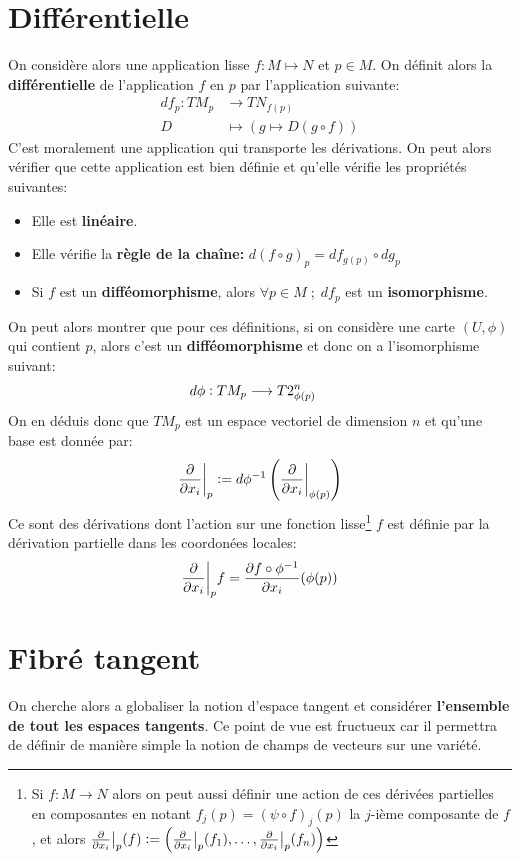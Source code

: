 \section{Différentielle}
On considère alors une application lisse \( f : M \longmapsto N \) et \( p \in M \). On définit alors la \textbf{différentielle} de l'application \( f \) en \( p \) par l'application suivante:
\[ 
   \begin{aligned}
      df_p : TM_p &\longrightarrow TN_{f(p)} \\
      D &\longmapsto \left( g \longmapsto D(g \circ f) \right)
   \end{aligned} 
\]
C'est moralement une application qui transporte les dérivations. On peut alors vérifier que cette application est bien définie et qu'elle vérifie les propriétés suivantes:
\begin{itemize}
   \item Elle est \textbf{linéaire}.
   \item Elle vérifie la \textbf{règle de la chaîne:} \( d(f \circ g)_p = df_{g(p)} \circ dg_p \)
   \item Si \( f \) est un \textbf{difféomorphisme}, alors \( \forall p \in M \; ; \; df_p \) est un \textbf{isomorphisme}.
\end{itemize}
On peut alors montrer que pour ces définitions, si on considère une carte \( (U, \phi) \) qui contient \( p \), alors c'est un \textbf{difféomorphisme} et donc on a l'isomorphisme suivant:
\[ 
   \begin{aligned}
      d\phi : TM_p &\longrightarrow T2_{\phi(p)}^n
   \end{aligned} 
\]
On en déduis donc que \( TM_p \) est un espace vectoriel de dimension \( n \) et qu'une base  est donnée par:
\[ 
   \frac{\partial }{\partial x_i}\biggr|_p := d\phi^{-1}\left( \frac{\partial }{\partial x_i}\biggr|_{\phi(p)}\right) 
\]
Ce sont des dérivations dont l'action sur une fonction lisse\footnote[1]{Si \( f : M \longrightarrow N \) alors on peut aussi définir une action de ces dérivées partielles en composantes en notant \( f_j(p) = (\psi \circ f)_j(p) \) la \( j \)-ième composante de \( f \), et alors \( \frac{\partial }{\partial x_i}\bigr|_p(f) := \left(\frac{\partial }{\partial x_i}\bigr|_p(f_1), \ldots,  \frac{\partial }{\partial x_i}\bigr|_p(f_n)\right) \)} \( f \) est définie par la dérivation partielle dans les coordonées locales:
\[ 
   \frac{\partial }{\partial x_i}\biggr|_pf = \frac{\partial f \circ \phi^{-1}}{\partial x_i}(\phi(p))
\]

\pagebreak
\section{Fibré tangent}
On cherche alors a globaliser la notion d'espace tangent et considérer \textbf{l'ensemble de tout les espaces tangents}. Ce point de vue est fructueux car il permettra de définir de manière simple la notion de champs de vecteurs sur une variété.\< 

